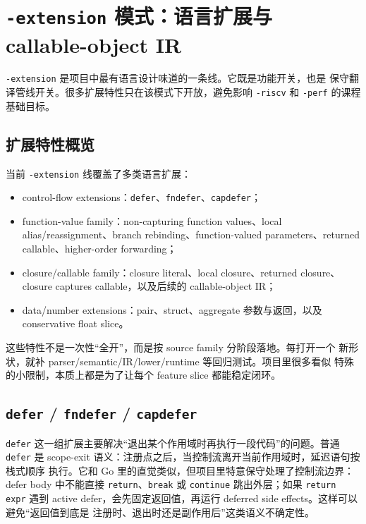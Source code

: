 \documentclass[UTF8,a4paper,11pt]{ctexart}
\begin{document}
\section{\texttt{-extension} 模式：语言扩展与 callable-object IR}

\texttt{-extension} 是项目中最有语言设计味道的一条线。它既是功能开关，也是
保守翻译管线开关。很多扩展特性只在该模式下开放，避免影响 \texttt{-riscv}
和 \texttt{-perf} 的课程基础目标。

\subsection{扩展特性概览}

当前 \texttt{-extension} 线覆盖了多类语言扩展：

\begin{itemize}
  \item control-flow extensions：\texttt{defer}、\texttt{fndefer}、\texttt{capdefer}；
  \item function-value family：non-capturing function values、local alias/reassignment、branch rebinding、function-valued parameters、returned callable、higher-order forwarding；
  \item closure/callable family：closure literal、local closure、returned closure、closure captures callable，以及后续的 callable-object IR；
  \item data/number extensions：pair、struct、aggregate 参数与返回，以及 conservative float slice。
\end{itemize}

这些特性不是一次性“全开”，而是按 source family 分阶段落地。每打开一个
新形状，就补 parser/semantic/IR/lower/runtime 等回归测试。项目里很多看似
特殊的小限制，本质上都是为了让每个 feature slice 都能稳定闭环。

\subsection{\texttt{defer} / \texttt{fndefer} / \texttt{capdefer}}

\texttt{defer} 这一组扩展主要解决“退出某个作用域时再执行一段代码”的问题。普通
\texttt{defer} 是 scope-exit 语义：注册点之后，当控制流离开当前作用域时，延迟语句按栈式顺序
执行。它和 Go 里的直觉类似，但项目里特意保守处理了控制流边界：defer body 中不能直接
\texttt{return}、\texttt{break} 或 \texttt{continue} 跳出外层；如果 \texttt{return expr}
遇到 active defer，会先固定返回值，再运行 deferred side effects。这样可以避免“返回值到底是
注册时、退出时还是副作用后”这类语义不确定性。
\end{document}
